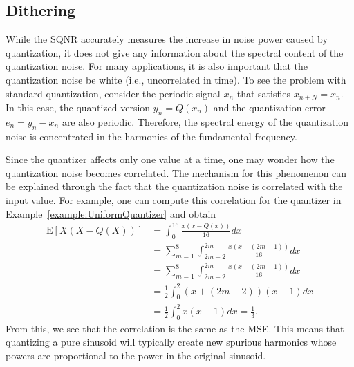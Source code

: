 \subsection{Dithering}

While the SQNR accurately measures the increase in noise power caused by quantization, it does not give any information about the spectral content of the quantization noise.
For many applications, it is also important that the quantization noise be white (i.e., uncorrelated in time).
To see the problem with standard quantization, consider the periodic signal $x_n$ that satisfies $x_{n+N} = x_n$.
In this case, the quantized version $y_n = Q(x_n)$ and the quantization error $e_n = y_n - x_n$ are also periodic.
Therefore, the spectral energy of the quantization noise is concentrated in the harmonics of the fundamental frequency.

Since the quantizer affects only one value at a time, one may wonder how the quantization noise becomes correlated.
The mechanism for this phenomenon can be explained through the fact that the quantization noise is correlated with the input value.
For example, one can compute this correlation for the quantizer in Example~\ref{example:UniformQuantizer} and obtain
\begin{align*}
\mathrm{E} \left[X \left(X - Q(X)\right) \right] 
&= \int_0^{16} \frac{x(x - Q(x))}{16} dx \\
&= \sum_{m=1}^8 \int_{2m-2}^{2m} \frac{x(x - (2m - 1))}{16} dx \\
&= \sum_{m=1}^8 \int_{2m-2}^{2m} \frac{x(x - (2m - 1))}{16} dx \\
&= \frac{1}{2} \int_{0}^{2} (x+(2m-2))(x - 1) dx \\
&= \frac{1}{2} \int_{0}^{2} x(x - 1) dx = \frac{1}{3}.
\end{align*}
From this, we see that the correlation is the same as the MSE.
This means that quantizing a pure sinusoid will typically create new spurious harmonics whose powers are proportional to the power in the original sinusoid.

